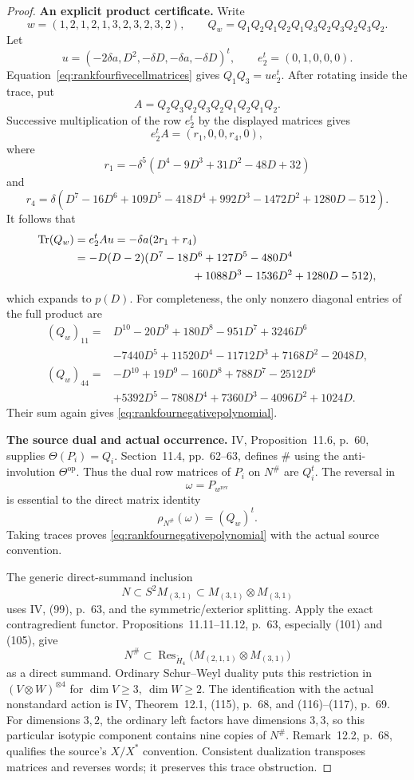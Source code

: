 \documentclass[11pt,a4paper]{article}
\theoremstyle{named}\newtheorem{finding}{Finding}[section]
\theoremstyle{definition}\newtheorem{definition}[finding]{Definition}
\theoremstyle{remark}\newtheorem{remark}[finding]{Remark}
\begin{document}
\begin{proof}
\par\smallskip\noindent\textbf{An explicit product certificate.}\quad
Write
\[
 w=(1,2,1,2,1,3,2,3,2,3,2),\qquad
 Q_w=Q_1Q_2Q_1Q_2Q_1Q_3Q_2Q_3Q_2Q_3Q_2.
\]
Let
\[
 u=(-2\delta a,D^2,-\delta D,-\delta a,-\delta D)^t,
 \qquad e_2^t=(0,1,0,0,0).
\]
Equation~\eqref{eq:rankfourfivecellmatrices} gives
\(Q_1Q_3=ue_2^t\). After rotating inside the trace, put
\[
 A=Q_2Q_3Q_2Q_3Q_2Q_1Q_2Q_1Q_2.
\]
Successive multiplication of the row \(e_2^t\) by the
displayed matrices gives
\[
 e_2^tA=(r_1,0,0,r_4,0),
\]
where
\[
 r_1=-\delta^5(D^4-9D^3+31D^2-48D+32)
\]
and
\[
 r_4=\delta(D^7-16D^6+109D^5-418D^4
                 +992D^3-1472D^2+1280D-512).
\]
It follows that
\begin{align*}
 \operatorname{Tr}(Q_w)
 &=e_2^tAu=-\delta a(2r_1+r_4)\\
 &=-D(D-2)(D^7-18D^6+127D^5-480D^4\\
 &\hspace{37mm}+1088D^3-1536D^2+1280D-512),
\end{align*}
which expands to \(p(D)\).
For completeness, the only nonzero diagonal entries of
the full product are
\[
\begin{aligned}
(Q_w)_{11}={}&D^{10}-20D^9+180D^8-951D^7+3246D^6\\
&-7440D^5+11520D^4-11712D^3+7168D^2-2048D,\\
(Q_w)_{44}={}&-D^{10}+19D^9-160D^8+788D^7-2512D^6\\
&+5392D^5-7808D^4+7360D^3-4096D^2+1024D.
\end{aligned}
\]
Their sum again gives
\eqref{eq:rankfournegativepolynomial}.

\par\smallskip\noindent\textbf{The source dual and actual occurrence.}\quad
IV, Proposition~11.6, p.~60, supplies \(\Theta(P_i)=Q_i\).
Section~11.4, pp.~62--63, defines \(\#\) using the
anti-involution \(\Theta^{\mathrm{op}}\).
Thus the dual row matrices of \(P_i\) on \(N^\#\) are \(Q_i^t\).
The reversal in
\[
 \omega=P_{w^{\mathrm{rev}}}
\]
is essential to the direct matrix identity
\[
 \rho_{N^\#}(\omega)=(Q_w)^t.
\]
Taking traces proves
\eqref{eq:rankfournegativepolynomial} with the actual
source convention.

The generic direct-summand inclusion
\[
 N\subset S^2M_{(3,1)}
      \subset M_{(3,1)}\otimes M_{(3,1)}
\]
uses IV, (99), p.~63, and the symmetric/exterior splitting.
Apply the exact contragredient functor.
Propositions~11.11--11.12, p.~63, especially (101) and (105),
give
\[
 N^\#\subset
 \operatorname{Res}_{\check H_4}
   \big(M_{(2,1,1)}\otimes M_{(3,1)}\big)
\]
as a direct summand.
Ordinary Schur--Weyl duality puts this restriction in
\((V\otimes W)^{\otimes4}\) for \(\dim V\ge3,\ \dim W\ge2\).
The identification with the actual nonstandard action is
IV, Theorem~12.1, (115), p.~68, and (116)--(117), p.~69.
For dimensions \(3,2\), the ordinary left factors have
dimensions \(3,3\), so this particular isotypic component
contains nine copies of \(N^\#\).
Remark~12.2, p.~68, qualifies the source's \(X/X^*\)
convention. Consistent dualization transposes matrices and
reverses words; it preserves this trace obstruction.


\end{proof}
\end{document}
